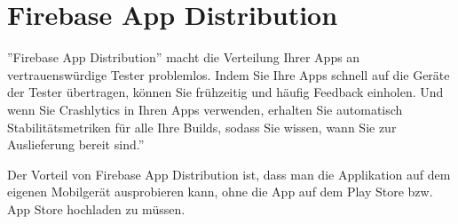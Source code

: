 \section{Firebase App Distribution}

''Firebase App Distribution'' macht die Verteilung
Ihrer Apps an vertrauenswürdige Tester problemlos. Indem Sie Ihre Apps schnell
auf die Geräte der Tester übertragen, können Sie frühzeitig und häufig
Feedback einholen.
Und wenn Sie Crashlytics in Ihren Apps verwenden, erhalten Sie automatisch Stabilitätsmetriken für alle Ihre Builds, sodass Sie wissen, wann Sie zur Auslieferung bereit sind.''\cite{fire-base-app-distribution}

Der Vorteil von Firebase App Distribution ist,
dass man die Applikation auf dem eigenen Mobilgerät ausprobieren kann,
ohne die App auf dem Play Store bzw. App Store hochladen zu müssen.